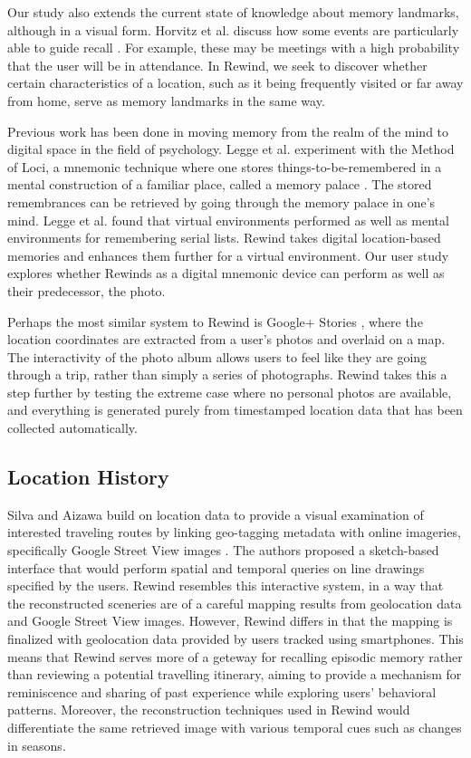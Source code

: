 \documentclass{sigchi}
\begin{document}
Our study also extends the current state of knowledge about memory landmarks, although in a visual form. Horvitz et al. discuss how some events are particularly able to guide recall \cite{horvitz2004learning}. For example, these may be meetings with a high probability that the user will be in attendance. In Rewind, we seek to discover whether certain characteristics of a location, such as it being frequently visited or far away from home, serve as memory landmarks in the same way. 

Previous work has been done in moving memory from the realm of the mind to digital space in the field of psychology. Legge et al. experiment with the Method of Loci, a mnemonic technique where one stores things-to-be-remembered in a mental construction of a familiar place, called a memory palace \cite{legge2012building}. The stored remembrances can be retrieved by going through the memory palace in one's mind. Legge et al. found that virtual environments performed as well as mental environments for remembering serial lists. Rewind takes digital location-based memories and enhances them further for a virtual environment. Our user study explores whether Rewinds as a digital mnemonic device can perform as well as their predecessor, the photo.

Perhaps the most similar system to Rewind is Google+ Stories \cite{googlestories}, where the location coordinates are extracted from a user's photos and overlaid on a map. The interactivity of the photo album allows users to feel like they are going through a trip, rather than simply a series of photographs. Rewind takes this a step further by testing the extreme case where no personal photos are available, and everything is generated purely from timestamped location data that has been collected automatically.

\subsection{Location History}
Silva and Aizawa build on location data to provide a visual examination of interested traveling routes by linking geo-tagging metadata with online imageries, specifically Google Street View images \cite{deSilva:2009:RMT:1631272.1631414}. The authors proposed a sketch-based interface that would perform spatial and temporal queries on line drawings specified by the users. Rewind resembles this interactive system, in a way that the reconstructed sceneries are of a careful mapping results from geolocation data and Google Street View images. However, Rewind differs in that the mapping is finalized with geolocation data provided by users tracked using smartphones. This means that Rewind serves more of a geteway for recalling episodic memory rather than reviewing a potential travelling itinerary, aiming to provide a mechanism for reminiscence and sharing of past experience while exploring users' behavioral patterns. Moreover, the reconstruction techniques used in Rewind would differentiate the same retrieved image with various temporal cues such as changes in seasons. %
\end{document}
